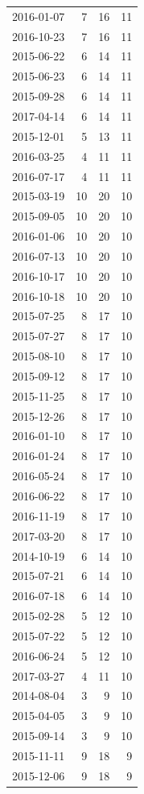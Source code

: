 \begin{tabular}{lrrr}
2016-01-07 & 7 & 16 & 11 \\
2016-10-23 & 7 & 16 & 11 \\
2015-06-22 & 6 & 14 & 11 \\
2015-06-23 & 6 & 14 & 11 \\
2015-09-28 & 6 & 14 & 11 \\
2017-04-14 & 6 & 14 & 11 \\
2015-12-01 & 5 & 13 & 11 \\
2016-03-25 & 4 & 11 & 11 \\
2016-07-17 & 4 & 11 & 11 \\
2015-03-19 & 10 & 20 & 10 \\
2015-09-05 & 10 & 20 & 10 \\
2016-01-06 & 10 & 20 & 10 \\
2016-07-13 & 10 & 20 & 10 \\
2016-10-17 & 10 & 20 & 10 \\
2016-10-18 & 10 & 20 & 10 \\
2015-07-25 & 8 & 17 & 10 \\
2015-07-27 & 8 & 17 & 10 \\
2015-08-10 & 8 & 17 & 10 \\
2015-09-12 & 8 & 17 & 10 \\
2015-11-25 & 8 & 17 & 10 \\
2015-12-26 & 8 & 17 & 10 \\
2016-01-10 & 8 & 17 & 10 \\
2016-01-24 & 8 & 17 & 10 \\
2016-05-24 & 8 & 17 & 10 \\
2016-06-22 & 8 & 17 & 10 \\
2016-11-19 & 8 & 17 & 10 \\
2017-03-20 & 8 & 17 & 10 \\
2014-10-19 & 6 & 14 & 10 \\
2015-07-21 & 6 & 14 & 10 \\
2016-07-18 & 6 & 14 & 10 \\
2015-02-28 & 5 & 12 & 10 \\
2015-07-22 & 5 & 12 & 10 \\
2016-06-24 & 5 & 12 & 10 \\
2017-03-27 & 4 & 11 & 10 \\
2014-08-04 & 3 & 9 & 10 \\
2015-04-05 & 3 & 9 & 10 \\
2015-09-14 & 3 & 9 & 10 \\
2015-11-11 & 9 & 18 & 9 \\
2015-12-06 & 9 & 18 & 9 \\

\end{tabular}
